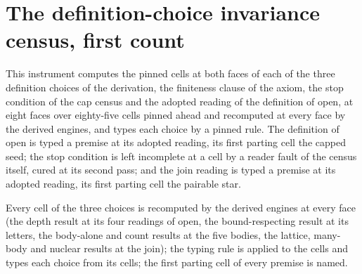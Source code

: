 \section{The definition-choice invariance census, first count}\label{mod:I-1-D538240-the-definition-choice-invariance-census}
\begin{chtable}\label{box:I-1-D538240-the-definition-choice-invariance-census:1}
This instrument computes the pinned cells at both faces of each of the three definition choices of the derivation, the finiteness clause of the axiom, the stop condition of the cap census and the adopted reading of the definition of open, at eight faces over eighty-five cells pinned ahead and recomputed at every face by the derived engines, and types each choice by a pinned rule. The definition of open is typed a premise at its adopted reading, its first parting cell the capped seed; the stop condition is left incomplete at a cell by a reader fault of the census itself, cured at its second pass; and the join reading is typed a premise at its adopted reading, its first parting cell the pairable star.
\end{chtable}
Every cell of the three choices is recomputed by the derived engines at every face (the depth result at its four readings of open, the bound-respecting result at its letters, the body-alone and count results at the five bodies, the lattice, many-body and nuclear results at the join); the typing rule is applied to the cells and types each choice from its cells; the first parting cell of every premise is named.

